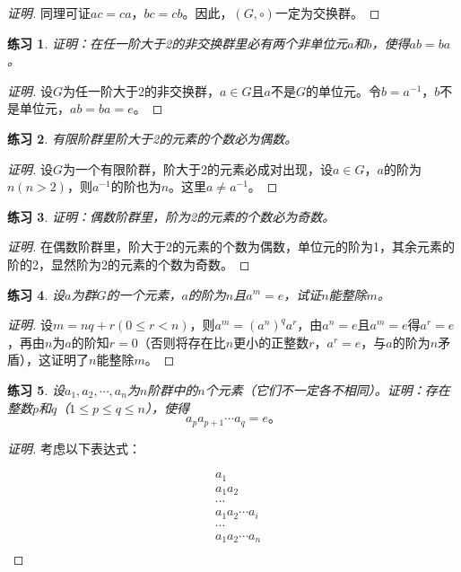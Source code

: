 \documentclass{article}
\newtheorem{Exercise}{练习}
\begin{document}
\begin{CJK*}{UTF8}{gbsn}
\begin{proof}[证明]
同理可证$ac=ca$，$bc=cb$。因此，$(G,\circ)$一定为交换群。
\end{proof}
\begin{Exercise}
  证明：在任一阶大于2的非交换群里必有两个非单位元$a$和$b$，使得$ab=ba$。
\end{Exercise}
\begin{proof}[证明]
  设$G$为任一阶大于2的非交换群，$a\in G$且$a$不是$G$的单位元。令$b=a^{-1}$，$b$不是单位元，$ab=ba=e$。
\end{proof}
\begin{Exercise}
  有限阶群里阶大于2的元素的个数必为偶数。
\end{Exercise}
\begin{proof}[证明]
  设$G$为一个有限阶群，阶大于2的元素必成对出现，设$a\in G$，$a$的阶为$n(n>2)$，则$a^{-1}$的阶也为$n$。这里$a\neq a^{-1}$。
\end{proof}
\begin{Exercise}
  证明：偶数阶群里，阶为2的元素的个数必为奇数。
\end{Exercise}
\begin{proof}[证明]
  在偶数阶群里，阶大于2的元素的个数为偶数，单位元的阶为1，其余元素的阶的2，显然阶为2的元素的个数为奇数。
\end{proof}
\begin{Exercise}
  设$a$为群$G$的一个元素，$a$的阶为$n$且$a^m=e$，试证$n$能整除$m$。
\end{Exercise}
\begin{proof}[证明]
  设$m=nq+r(0\leq r <n)$，则$a^m=(a^n)^qa^r$，由$a^n=e$且$a^m=e$得$a^r=e$，再由$n$为$a$的阶知$r=0$（否则将存在比$n$更小的正整数$r$，$a^r=e$，与$a$的阶为$n$矛盾），这证明了$n$能整除$m$。
\end{proof}
\begin{Exercise}
  设$a_1,a_2,\cdots,a_n$为$n$阶群中的$n$个元素（它们不一定各不相同）。证明：存在整数$p$和$q$（$1\leq p \leq q \leq n$），使得
  \[a_pa_{p+1}\cdots a_q=e\text{。}\]
\end{Exercise}
\begin{proof}[证明]
  考虑以下表达式：

  \begin{align*}
    &a_1\\
    &a_1a_2\\
    &\cdots\\
    &a_1a_2\cdots a_i\\
    &\cdots\\
    &a_1a_2\cdots a_n\\
  \end{align*}


\end{proof}
\end{CJK*}
\end{document}
